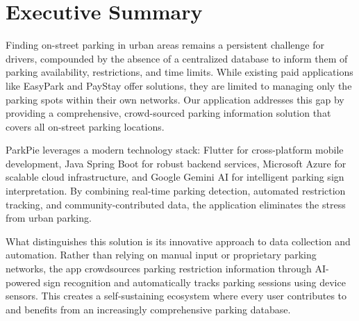 \section{Executive Summary}

Finding on-street parking in urban areas remains a persistent challenge for drivers, compounded by the absence of a centralized database to inform them of parking availability, restrictions, and time limits. While existing paid applications like EasyPark and PayStay offer solutions, they are limited to managing only the parking spots within their own networks. Our application addresses this gap by providing a comprehensive, crowd-sourced parking information solution that covers all on-street parking locations.

ParkPie leverages a modern technology stack: Flutter for cross-platform mobile development, Java Spring Boot for robust backend services, Microsoft Azure for scalable cloud infrastructure, and Google Gemini AI for intelligent parking sign interpretation. By combining real-time parking detection, automated restriction tracking, and community-contributed data, the application eliminates the stress from urban parking.

What distinguishes this solution is its innovative approach to data collection and automation. Rather than relying on manual input or proprietary parking networks, the app crowdsources parking restriction information through AI-powered sign recognition and automatically tracks parking sessions using device sensors. This creates a self-sustaining ecosystem where every user contributes to and benefits from an increasingly comprehensive parking database.
